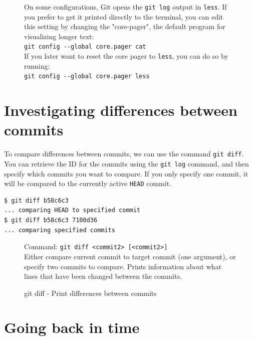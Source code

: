 \documentclass[../main/git_course_main.tex]{subfiles}
\begin{document}
\begin{figure}[h!]
\begin{redbox}
On some configurations, Git opens the \verb$git log$ output in \verb$less$. If you prefer to get it printed directly to the terminal, you can edit this setting by changing the "core-pager", the default program for visualizing longer text: \\

\verb$git config --global core.pager cat$ \\

If you later want to reset the core pager to \verb$less$, you can do so by running: \\

\verb$git config --global core.pager less$
\end{redbox}
\end{figure}

\section{Investigating differences between commits}

To compare differences between commits, we can use the command \verb$git diff$.
You can retrieve the ID for the commits using the \verb$git log$ command, and then
specify which commits you want to compare. If you only specify one commit, it will
be compared to the currently active \verb$HEAD$ commit.

\begin{codebox}
\begin{lstlisting}
$ git diff b58c6c3
... comparing HEAD to specified commit
$ git diff b58c6c3 7100d36
... comparing specified commits
\end{lstlisting}
\end{codebox}

\begin{figure}[h!]
\begin{bluebox}
Command: \verb$git diff <commit2> [<commit2>]$ \\

Either compare current commit to target commit (one argument), or
specify two commits to compare. Prints information about what lines
that have been changed between the commits.
\end{bluebox}
\label{command:diff}
\caption{git diff - Print differences between commits}
\end{figure}

\section{Going back in time}
\end{document}
